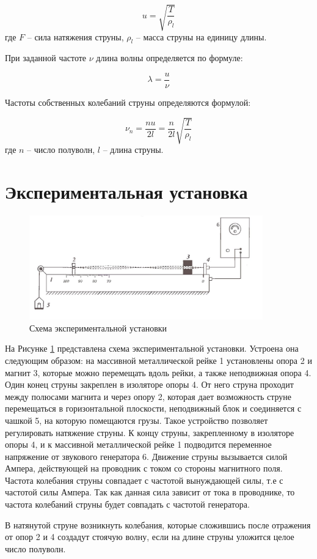 \documentclass[a4paper,12pt]{article}
\begin{document}
	\begin{equation}
		u = \sqrt{\frac{T}{\rho_l}}
		\label{velocity_of_deformation}
	\end{equation}
	где $F$ -- сила натяжения струны, $\rho_{l}$ -- масса струны на единицу длины.
	
	При заданной частоте $\nu$ длина волны определяется по формуле:
	
	\begin{equation}
		\lambda = \frac{u}{\nu}
	\end{equation}
	
	Частоты собственных колебаний струны определяются формулой:
	
	\begin{equation}
		\nu_{n} = \frac{nu}{2l} = \frac{n}{2l}\sqrt{\frac{T}{\rho_l}}
		\label{frequency_velocity_equation}
	\end{equation}
	где $n$ -- число полуволн, $l$ -- длина струны.
	
	\section{Экспериментальная установка}
	
	\begin{figure}[h!]
		\begin{center}
			\includegraphics[width = 0.9\textwidth]{1.4.5 ustan}
			\caption{Схема экспериментальной установки}
			\label{facility}
		\end{center}
	\end{figure}
	
	На Рисунке \ref{facility} представлена схема экспериментальной установки. Устроена она следующим образом: на массивной металлической рейке 1 установлены опора 2 и магнит 3, которые можно перемещать вдоль рейки, а также неподвижная опора 4. Один конец струны закреплен в изоляторе опоры 4. От него струна проходит между полюсами магнита и через опору 2, которая дает возможность струне перемещаться в горизонтальной плоскости, неподвижный блок и соединяется с чашкой 5, на которую помещаются грузы. Такое устройство позволяет регулировать натяжение струны.  К концу струны, закрепленному в изоляторе опоры 4, и к массивной металлической рейке 1 подводится переменное напряжение от звукового генератора 6. Движение струны вызывается силой Ампера, действующей на проводник с током со стороны магнитного поля. Частота колебания струны совпадает с частотой вынуждающей силы, т.е с частотой силы Ампера. Так как данная сила зависит от тока в проводнике, то частота колебаний струны будет совпадать с частотой генератора.
	
	В натянутой струне возникнуть колебания, которые сложившись после отражения от опор 2 и 4 создадут стоячую волну, если на длине струны уложится целое число полуволн.
	
\end{document}
